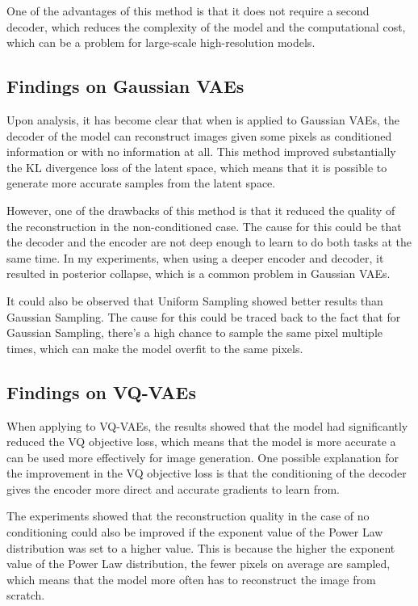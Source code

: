 One of the advantages of this method is that it does not require a second decoder, which reduces the complexity of the model and the computational cost, which can be a problem for large-scale high-resolution models.

\subsection{Findings on Gaussian VAEs}

Upon analysis, it has become clear that when  is applied to Gaussian VAEs, the decoder of the model can reconstruct images given some pixels as conditioned information or with no information at all. This method improved substantially the KL divergence loss of the latent space, which means that it is possible to generate more accurate samples from the latent space. 

However, one of the drawbacks of this method is that it reduced the quality of the reconstruction in the non-conditioned case. The cause for this could be that the decoder and the encoder are not deep enough to learn to do both tasks at the same time. In my experiments, when using a deeper encoder and decoder, it resulted in posterior collapse, which is a common problem in Gaussian VAEs.

It could also be observed that Uniform Sampling showed better results than Gaussian Sampling. The cause for this could be traced back to the fact that for Gaussian Sampling, there's a high chance to sample the same pixel multiple times, which can make the model overfit to the same pixels.


\subsection{Findings on VQ-VAEs}

When applying  to VQ-VAEs, the results showed that the model had significantly reduced the VQ objective loss, which means that the model is more accurate a can be used more effectively for image generation. One possible explanation for the improvement in the VQ objective loss is that the conditioning of the decoder gives the encoder more direct and accurate gradients to learn from.

The experiments showed that the reconstruction quality in the case of no conditioning could also be improved if the exponent value of the Power Law distribution was set to a higher value. This is because the higher the exponent value of the Power Law distribution, the fewer pixels on average are sampled, which means that the model more often has to reconstruct the image from scratch.

